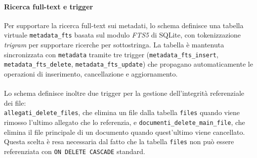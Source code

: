 \documentclass[a4paper,12pt]{article}
\begin{document}
{{{            \paragraph{Ricerca full-text e trigger}
                Per supportare la ricerca full-text sui metadati, lo schema definisce una 
                tabella virtuale \texttt{metadata\_fts} basata sul modulo \textit{FTS5} di 
                SQLite, con tokenizzazione \textit{trigram} per supportare ricerche per 
                sottostringa. La tabella è mantenuta sincronizzata con \texttt{metadata} 
                tramite tre trigger (\texttt{metadata\_fts\_insert}, 
                \texttt{metadata\_fts\_delete}, \texttt{metadata\_fts\_update}) che 
                propagano automaticamente le operazioni di inserimento, cancellazione 
                e aggiornamento.\\
                \\
                \noindent Lo schema definisce inoltre due trigger per la gestione 
                dell'integrità referenziale dei file:\\ \texttt{allegati\_delete\_files}, 
                che elimina un file dalla tabella \texttt{files} quando viene rimosso 
                l'ultimo allegato che lo referenzia, e \texttt{documenti\_delete\_main\_file}, 
                che elimina il file principale di un documento quando quest'ultimo viene 
                cancellato. Questa scelta è resa necessaria dal fatto che la tabella 
                \texttt{files} non può essere referenziata con \texttt{ON DELETE CASCADE} 
                standard.

}}}
\end{document}
